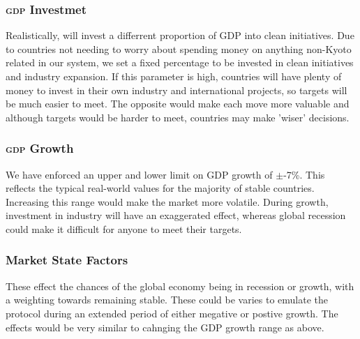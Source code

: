 \subsubsection{\textsc{gdp} Investmet}

Realistically, will invest a differrent proportion of GDP into clean initiatives. Due to countries not needing to worry about spending money on anything non-Kyoto related in our system, we set a fixed percentage to be invested in clean initiatives and industry expansion. If this parameter is high, countries will have plenty of money to invest in their own industry and international projects, so targets will be much easier to meet. The opposite would make each move more valuable and although targets would be harder to meet, countries may make 'wiser' decisions.

\subsubsection{\textsc{gdp} Growth}

We have enforced an upper and lower limit on GDP growth of $\pm$-7\%. This reflects the typical real-world values for the majority of stable countries. Increasing this range would make the market more volatile. During growth, investment in industry will have an exaggerated effect, whereas global recession could make it difficult for anyone to meet their targets.

\subsubsection{Market State Factors}

These effect the chances of the global economy being in recession or growth, with a weighting towards remaining stable. These could be varies to emulate the protocol during an extended period of either megative or postive growth. The effects would be very similar to cahnging the GDP growth range as above.
